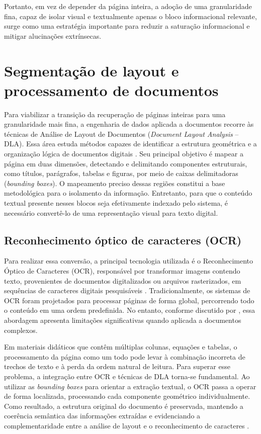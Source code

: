 Portanto, em vez de depender da página inteira, a adoção de uma granularidade fina, capaz de isolar visual e textualmente apenas o bloco informacional relevante, surge como uma estratégia importante para reduzir a saturação informacional e mitigar alucinações extrínsecas.

\section{Segmentação de layout e processamento de documentos}
\label{sec:segmentacao_layout}

Para viabilizar a transição da recuperação de páginas inteiras para uma granularidade mais fina, a engenharia de dados aplicada a documentos recorre às técnicas de Análise de Layout de Documentos (\textit{Document Layout Analysis} -- DLA). Essa área estuda métodos capazes de identificar a estrutura geométrica e a organização lógica de documentos digitais . Seu principal objetivo é mapear a página em duas dimensões, detectando e delimitando componentes estruturais, como títulos, parágrafos, tabelas e figuras, por meio de caixas delimitadoras (\textit{bounding boxes}). O mapeamento preciso dessas regiões constitui a base metodológica para o isolamento da informação. Entretanto, para que o conteúdo textual presente nesses blocos seja efetivamente indexado pelo sistema, é necessário convertê-lo de uma representação visual para texto digital.

\subsection{Reconhecimento óptico de caracteres (OCR)}
\label{subsec:ocr}

Para realizar essa conversão, a principal tecnologia utilizada é o Reconhecimento Óptico de Caracteres (OCR), responsável por transformar imagens contendo texto, provenientes de documentos digitalizados ou arquivos rasterizados, em sequências de caracteres digitais pesquisáveis . Tradicionalmente, os sistemas de OCR foram projetados para processar páginas de forma global, percorrendo todo o conteúdo em uma ordem predefinida. No entanto, conforme discutido por , essa abordagem apresenta limitações significativas quando aplicada a documentos complexos.

Em materiais didáticos que contêm múltiplas colunas, equações e tabelas, o processamento da página como um todo pode levar à combinação incorreta de trechos de texto e à perda da ordem natural de leitura. Para superar esse problema, a integração entre OCR e técnicas de DLA torna-se fundamental. Ao utilizar as \textit{bounding boxes} para orientar a extração textual, o OCR passa a operar de forma localizada, processando cada componente geométrico individualmente. Como resultado, a estrutura original do documento é preservada, mantendo a coerência semântica das informações extraídas e evidenciando a complementaridade entre a análise de layout e o reconhecimento de caracteres .

